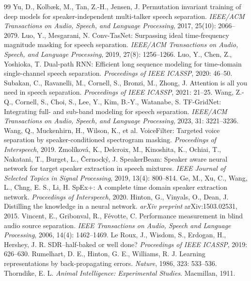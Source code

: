\documentclass[UTF8,zihao=5,a4paper]{ctexart}
\begin{document}
\begin{thebibliography}{99}
 Yu, D., Kolb{\ae}k, M., Tan, Z.-H., Jensen, J. Permutation invariant training of deep models for speaker-independent multi-talker speech separation. \textit{IEEE/ACM Transactions on Audio, Speech, and Language Processing}, 2017, 25(10): 2066--2079.
 Luo, Y., Mesgarani, N. Conv-TasNet: Surpassing ideal time-frequency magnitude masking for speech separation. \textit{IEEE/ACM Transactions on Audio, Speech, and Language Processing}, 2019, 27(8): 1256--1266.
 Luo, Y., Chen, Z., Yoshioka, T. Dual-path RNN: Efficient long sequence modeling for time-domain single-channel speech separation. \textit{Proceedings of IEEE ICASSP}, 2020: 46--50.
 Subakan, C., Ravanelli, M., Cornell, S., Bronzi, M., Zhong, J. Attention is all you need in speech separation. \textit{Proceedings of IEEE ICASSP}, 2021: 21--25.
 Wang, Z.-Q., Cornell, S., Choi, S., Lee, Y., Kim, B.-Y., Watanabe, S. TF-GridNet: Integrating full- and sub-band modeling for speech separation. \textit{IEEE/ACM Transactions on Audio, Speech, and Language Processing}, 2023, 31: 3221--3236.
 Wang, Q., Muckenhirn, H., Wilson, K., et al. VoiceFilter: Targeted voice separation by speaker-conditioned spectrogram masking. \textit{Proceedings of Interspeech}, 2019.
 Zmol{\'i}kov{\'a}, K., Delcroix, M., Kinoshita, K., Ochiai, T., Nakatani, T., Burget, L., \v{C}ernock{\'y}, J. SpeakerBeam: Speaker aware neural network for target speaker extraction in speech mixtures. \textit{IEEE Journal of Selected Topics in Signal Processing}, 2019, 13(4): 800--814.
 Ge, M., Xu, C., Wang, L., Chng, E. S., Li, H. SpEx+: A complete time domain speaker extraction network. \textit{Proceedings of Interspeech}, 2020.
 Hinton, G., Vinyals, O., Dean, J. Distilling the knowledge in a neural network. \textit{arXiv preprint} arXiv:1503.02531, 2015.
 Vincent, E., Gribonval, R., F{\'e}votte, C. Performance measurement in blind audio source separation. \textit{IEEE Transactions on Audio, Speech and Language Processing}, 2006, 14(4): 1462--1469.
 Le Roux, J., Wisdom, S., Erdogan, H., Hershey, J. R. SDR--half-baked or well done? \textit{Proceedings of IEEE ICASSP}, 2019: 626--630.
 Rumelhart, D. E., Hinton, G. E., Williams, R. J. Learning representations by back-propagating errors. \textit{Nature}, 1986, 323: 533--536.
 Thorndike, E. L. \textit{Animal Intelligence: Experimental Studies}. Macmillan, 1911.

\end{thebibliography}
\end{document}
